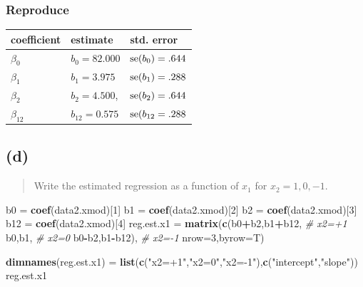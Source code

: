 \documentclass[
]{article}
\newenvironment{Shaded}{\begin{snugshade}}{\end{snugshade}}
\newcommand{\AttributeTok}[1]{\textcolor[rgb]{0.13,0.29,0.53}{#1}}
\newcommand{\CommentTok}[1]{\textcolor[rgb]{0.56,0.35,0.01}{\textit{#1}}}
\newcommand{\DecValTok}[1]{\textcolor[rgb]{0.00,0.00,0.81}{#1}}
\newcommand{\FunctionTok}[1]{\textcolor[rgb]{0.13,0.29,0.53}{\textbf{#1}}}
\newcommand{\NormalTok}[1]{#1}
\newcommand{\OtherTok}[1]{\textcolor[rgb]{0.56,0.35,0.01}{#1}}
\newcommand{\SpecialCharTok}[1]{\textcolor[rgb]{0.81,0.36,0.00}{\textbf{#1}}}
\newcommand{\StringTok}[1]{\textcolor[rgb]{0.31,0.60,0.02}{#1}}
\begin{document}
\hypertarget{reproduce-9}{%
\subsubsection{Reproduce}\label{reproduce-9}}

\begin{longtable}[]{@{}lll@{}}
\toprule\noalign{}
coefficient & estimate & std. error \\
\midrule\noalign{}
\endhead
\bottomrule\noalign{}
\endlastfoot
\(\beta_0\) & \(b_0=82.000\) & \(\operatorname{se}(b_0) = .644\) \\
\(\beta_1\) & \(b_1=3.975\) & \(\operatorname{se}(b_1) = .288\) \\
\(\beta_2\) & \(b_2=4.500\), & \(\operatorname{se}(b_2) = .644\) \\
\(\beta_{1 2}\) & \(b_{12}=0.575\) & \(\operatorname{se}(b_{12} = .288\) \\
\end{longtable}

\hypertarget{d-1}{%
\subsection{(d)}\label{d-1}}

\begin{quote}
Write the estimated regression as a function of \(x_1\) for
\(x_2 = 1,0,-1\).
\end{quote}

\begin{Shaded}
\begin{Highlighting}[]
\NormalTok{b0 }\OtherTok{=} \FunctionTok{coef}\NormalTok{(data2.xmod)[}\DecValTok{1}\NormalTok{]}
\NormalTok{b1 }\OtherTok{=} \FunctionTok{coef}\NormalTok{(data2.xmod)[}\DecValTok{2}\NormalTok{]}
\NormalTok{b2 }\OtherTok{=} \FunctionTok{coef}\NormalTok{(data2.xmod)[}\DecValTok{3}\NormalTok{]}
\NormalTok{b12 }\OtherTok{=} \FunctionTok{coef}\NormalTok{(data2.xmod)[}\DecValTok{4}\NormalTok{]}
\NormalTok{reg.est.x1 }\OtherTok{=} \FunctionTok{matrix}\NormalTok{(}\FunctionTok{c}\NormalTok{(b0}\SpecialCharTok{+}\NormalTok{b2,b1}\SpecialCharTok{+}\NormalTok{b12,  }\CommentTok{\# x2=+1}
\NormalTok{                      b0,b1,         }\CommentTok{\# x2=0}
\NormalTok{                      b0}\SpecialCharTok{{-}}\NormalTok{b2,b1}\SpecialCharTok{{-}}\NormalTok{b12), }\CommentTok{\# x2={-}1}
                    \AttributeTok{nrow=}\DecValTok{3}\NormalTok{,}\AttributeTok{byrow=}\NormalTok{T)}

\FunctionTok{dimnames}\NormalTok{(reg.est.x1) }\OtherTok{=} \FunctionTok{list}\NormalTok{(}\FunctionTok{c}\NormalTok{(}\StringTok{"x2=+1"}\NormalTok{,}\StringTok{"x2=0"}\NormalTok{,}\StringTok{"x2={-}1"}\NormalTok{),}\FunctionTok{c}\NormalTok{(}\StringTok{"intercept"}\NormalTok{,}\StringTok{"slope"}\NormalTok{))}
\NormalTok{reg.est.x1}
\end{Highlighting}
\end{Shaded}
\end{document}
